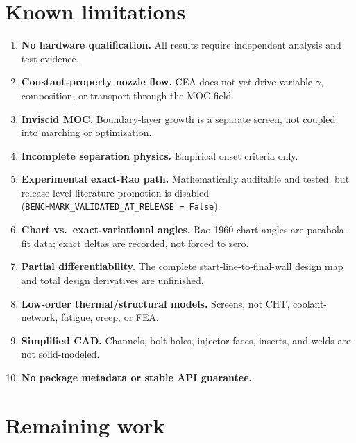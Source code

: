 \documentclass[11pt]{article}
\newcommand{\code}[1]{\texttt{#1}}
\begin{document}
\section{Known limitations}

\begin{enumerate}
\item \textbf{No hardware qualification.} All results require independent
analysis and test evidence.
\item \textbf{Constant-property nozzle flow.} CEA does not yet drive variable
$\gamma$, composition, or transport through the MOC field.
\item \textbf{Inviscid MOC.} Boundary-layer growth is a separate screen, not
coupled into marching or optimization.
\item \textbf{Incomplete separation physics.} Empirical onset criteria only.
\item \textbf{Experimental exact-Rao path.} Mathematically auditable and
tested, but release-level literature promotion is disabled
(\code{BENCHMARK\_VALIDATED\_AT\_RELEASE = False}).
\item \textbf{Chart vs.\ exact-variational angles.} Rao 1960 chart angles are
parabola-fit data; exact deltas are recorded, not forced to zero.
\item \textbf{Partial differentiability.} The complete
start-line-to-final-wall design map and total design derivatives are
unfinished.
\item \textbf{Low-order thermal/structural models.} Screens, not CHT,
coolant-network, fatigue, creep, or FEA.
\item \textbf{Simplified CAD.} Channels, bolt holes, injector faces, inserts,
and welds are not solid-modeled.
\item \textbf{No package metadata or stable API guarantee.}
\end{enumerate}

\section{Remaining work}
\end{document}

